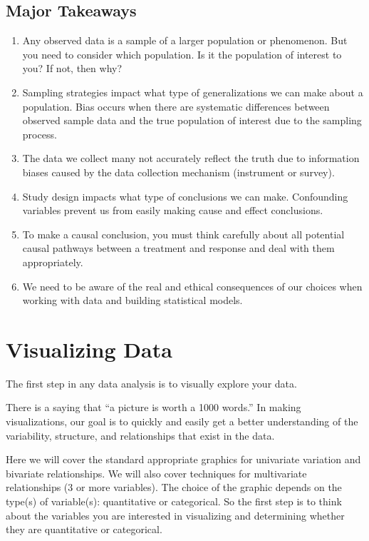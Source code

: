 \documentclass[]{book}
\begin{document}
\hypertarget{major-takeaways}{%
\section{Major Takeaways}\label{major-takeaways}}

\begin{enumerate}
\def\labelenumi{\arabic{enumi}.}
\item
  Any observed data is a sample of a larger population or phenomenon. But you need to consider which population. Is it the population of interest to you? If not, then why?
\item
  Sampling strategies impact what type of generalizations we can make about a population. Bias occurs when there are systematic differences between observed sample data and the true population of interest due to the sampling process.
\item
  The data we collect many not accurately reflect the truth due to information biases caused by the data collection mechanism (instrument or survey).
\item
  Study design impacts what type of conclusions we can make. Confounding variables prevent us from easily making cause and effect conclusions.
\item
  To make a causal conclusion, you must think carefully about all potential causal pathways between a treatment and response and deal with them appropriately.
\item
  We need to be aware of the real and ethical consequences of our choices when working with data and building statistical models.
\end{enumerate}

\hypertarget{visualizing-data}{%
\chapter{Visualizing Data}\label{visualizing-data}}

The first step in any data analysis is to visually explore your data.

There is a saying that ``a picture is worth a 1000 words.'' In making visualizations, our goal is to quickly and easily get a better understanding of the variability, structure, and relationships that exist in the data.

Here we will cover the standard appropriate graphics for univariate variation and bivariate relationships. We will also cover techniques for multivariate relationships (3 or more variables). The choice of the graphic depends on the type(s) of variable(s): quantitative or categorical. So the first step is to think about the variables you are interested in visualizing and determining whether they are quantitative or categorical.
\end{document}
